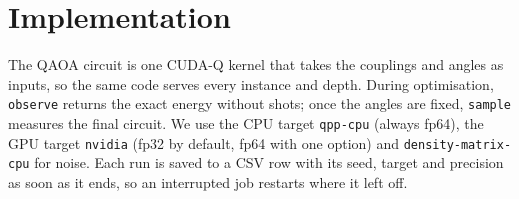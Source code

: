 
\section{Implementation}
\label{sec:implementation}

The QAOA circuit is one CUDA-Q kernel that takes the couplings and angles as inputs, so the same code serves every instance and depth.
During optimisation, \texttt{observe} returns the exact energy without shots; once the angles are fixed, \texttt{sample} measures the final circuit.
We use the CPU target \texttt{qpp-cpu} (always fp64), the GPU target \texttt{nvidia} (fp32 by default, fp64 with one option) and \texttt{density-matrix-cpu} for noise.
Each run is saved to a CSV row with its seed, target and precision as soon as it ends, so an interrupted job restarts where it left off.
